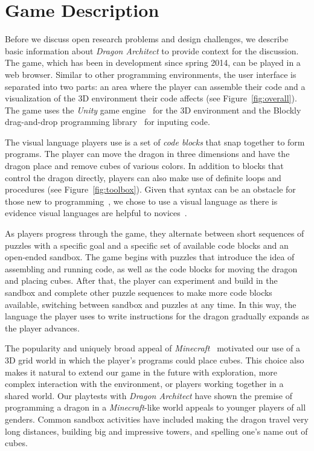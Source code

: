 \documentclass{sig-alternate}
\newcommand{\gametitle}{{\emph{Dragon Architect}}}
\begin{document}
\section{Game Description}
Before we discuss open research problems and design challenges, we describe basic information about \gametitle{} to provide context for the discussion.
The game, which has been in development since spring 2014, can be played in a web browser.
Similar to other programming environments, the user interface is separated into two parts: an area where the player can assemble their code and a visualization of the 3D environment their code affects (see Figure~\ref{fig:overall}). 
The game uses the \emph{Unity} game engine~\cite{unity} for the 3D environment and the Blockly drag-and-drop programming library~\cite{blockly} for inputing code.

The visual language players use is a set of \emph{code blocks} that snap together to form programs. 
The player can move the dragon in three dimensions and have the dragon place and remove cubes of various colors. 
In addition to blocks that control the dragon directly, players can also make use of definite loops and procedures (see Figure~\ref{fig:toolbox}).
Given that syntax can be an obstacle for those new to programming~\cite{stefik2013syntax}, we chose to use a visual language as there is evidence visual languages are helpful to novices~\cite{whitley1997visual}.

As players progress through the game, they alternate between short sequences of puzzles with a specific goal and a specific set of available code blocks and an open-ended sandbox. 
The game begins with puzzles that introduce the idea of assembling and running code, as well as the code blocks for moving the dragon and placing cubes.
After that, the player can experiment and build in the sandbox and complete other puzzle sequences to make more code blocks available, switching between sandbox and puzzles at any time. 
In this way, the language the player uses to write instructions for the dragon gradually expands as the player advances.

The popularity and uniquely broad appeal of \emph{Minecraft}~\cite{minecraft} motivated our use of a 3D grid world in which the player's programs could place cubes.
This choice also makes it natural to extend our game in the future with exploration, more complex interaction with the environment, or players working together in a shared world.
Our playtests with \gametitle{} have shown the premise of programming a dragon in a \emph{Minecraft}-like world appeals to younger players of all genders.
Common sandbox activities have included making the dragon travel very long distances, building big and impressive towers, and spelling one's name out of cubes.
\end{document}
